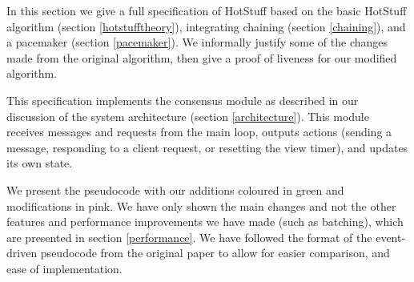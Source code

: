 In this section we give a full specification of HotStuff based on the basic HotStuff algorithm (section \ref{hotstufftheory}), integrating chaining (section \ref{chaining}), and a pacemaker (section \ref{pacemaker}). We informally justify some of the changes made from the original algorithm, then give a proof of liveness for our modified algorithm.

This specification implements the consensus module as described in our discussion of the system architecture (section \ref{architecture}). This module receives messages and requests from the main loop, outputs actions (sending a message, responding to a client request, or resetting the view timer), and updates its own state.

We present the pseudocode with our additions coloured in green and modifications in pink. We have only shown the main changes and not the other features and performance improvements we have made (such as batching), which are presented in section \ref{performance}. We have followed the format of the event-driven pseudocode from the original paper to allow for easier comparison, and ease of implementation.

